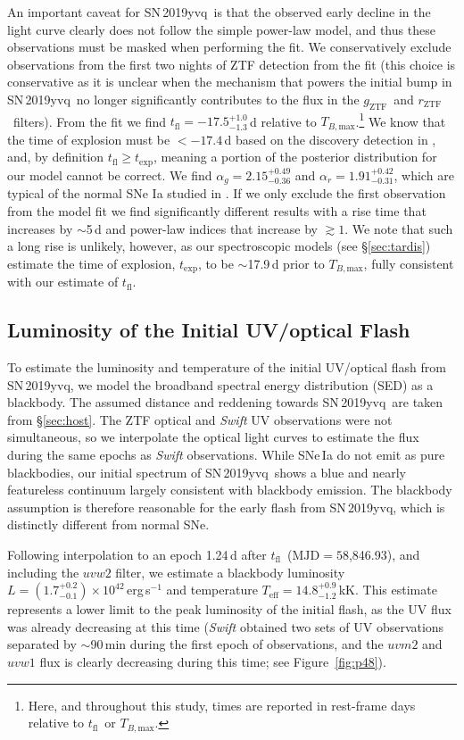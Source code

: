 \documentclass[twocolumn]{aastex63}
\newcommand{\rztf}{$r_\mathrm{ZTF}$}
\newcommand{\gztf}{$g_\mathrm{ZTF}$}
\newcommand{\tfl}{$t_\mathrm{fl}$}
\newcommand{\tbmax}{$T_{B,\mathrm{max}}$}
\newcommand{\sn}{SN\,2019yvq}
\begin{document}
An important caveat for \sn\ is that the observed early decline in the light
curve clearly does not follow the simple power-law model, and thus these
observations must be masked when performing the fit. We conservatively exclude
observations from the first two nights of ZTF detection from the fit (this
choice is conservative as it is unclear when the mechanism that powers the
initial bump in \sn\ no longer significantly contributes to the flux in the
\gztf\ and \rztf\ filters). From the fit we find \tfl$ =
-17.5^{+1.0}_{-1.3}$\,d relative to \tbmax.\footnote{Here, and throughout this
study, times are reported in rest-frame days relative to \tfl\ or \tbmax.} We
know that the time of explosion must be $< -17.4$\,d based on the discovery
detection in \citealt{Itagaki19}, and, by definition $t_\mathrm{fl} \ge
t_\mathrm{exp}$, meaning a portion of the posterior distribution for our model
cannot be correct. We find $\alpha_g = 2.15^{+0.49}_{-0.36}$ and $\alpha_r =
1.91^{+0.42}_{-0.31}$, which are typical of the normal SNe Ia studied in
\citet{Miller20}. If we only exclude the first observation from the model fit
we find significantly different results with a rise time that increases by
$\sim$5\,d and power-law indices that increase by $\gtrsim 1$. We note that
such a long rise is unlikely, however, as our spectroscopic models (see
\S\ref{sec:tardis}) estimate the time of explosion, $t_\mathrm{exp}$, to be
$\sim$17.9\,d prior to \tbmax, fully consistent with our estimate of \tfl.

\subsection{Luminosity of the Initial UV/optical Flash}\label{sec:luminosity}

To estimate the luminosity and temperature of the initial UV/optical flash
from \sn, we model the broadband spectral energy distribution (SED) as a
blackbody. The assumed distance and reddening towards \sn\ are taken from
\S\ref{sec:host}. The ZTF optical and \textit{Swift} UV observations were not
simultaneous, so we interpolate the optical light curves to estimate the flux
during the same epochs as \textit{Swift} observations. While SNe\,Ia do not
emit as pure blackbodies, our initial spectrum of \sn\ shows a blue and nearly
featureless continuum largely consistent with blackbody emission. The
blackbody assumption is therefore reasonable for the early flash from \sn,
which is distinctly different from normal SNe.

Following interpolation to an epoch 1.24\,d after \tfl\ ($\mathrm{MJD} =
58$,846.93), and including the $uvw2$ filter, we estimate a blackbody
luminosity $L = (1.7^{+0.2}_{-0.1}) \times 10^{42}$\,erg\,s$^{-1}$ and
temperature $T_\mathrm{eff} = 14.8^{+0.9}_{-1.2}$\,kK. This estimate
represents a lower limit to the peak luminosity of the initial flash, as the
UV flux was already decreasing at this time (\textit{Swift} obtained two sets
of UV observations separated by $\sim$90\,min during the first epoch of
observations, and the $uvm2$ and $uvw1$ flux is clearly decreasing during this
time; see Figure~\ref{fig:p48}).
\end{document}
